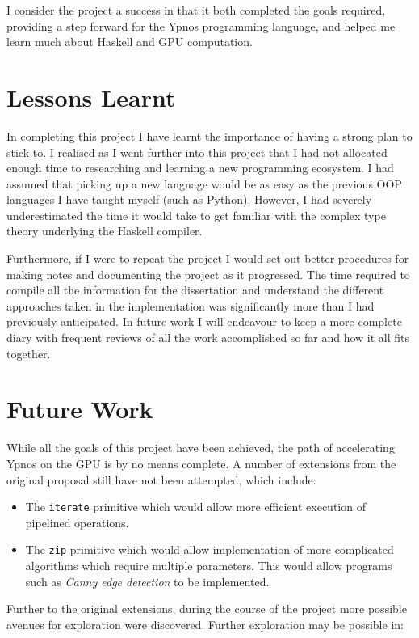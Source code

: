 \documentclass[12pt,a4paper,twoside]{scrbook}
\begin{document}
I consider the project a success in that it both completed the goals required,
providing a step forward for the Ypnos programming language, and helped me learn
much about Haskell and GPU computation.

\section{Lessons Learnt}

In completing this project I have learnt the importance of having a strong plan
to stick to. I realised as I went further into this project that I had not
allocated enough time to researching and learning a new programming ecosystem. I
had assumed that picking up a new language would be as easy as the previous OOP
languages I have taught myself (such as Python). However, I had severely
underestimated the time it would take to get familiar with the complex type
theory underlying the Haskell compiler.

Furthermore, if I were to repeat the project I would set out better procedures
for making notes and documenting the project as it progressed. The time required
to compile all the information for the dissertation and understand the different
approaches taken in the implementation was significantly more than I had
previously anticipated. In future work I will endeavour to keep a more complete
diary with frequent reviews of all the work accomplished so far and how it all
fits together.

\section{Future Work}

While all the goals of this project have been achieved, the path of accelerating
Ypnos on the GPU is by no means complete. A number of extensions from the
original proposal still have not been attempted, which include:

\begin{itemize}
\item The \texttt{iterate} primitive which would allow more efficient execution
  of pipelined operations.
\item The \texttt{zip} primitive which would allow implementation of more
  complicated algorithms which require multiple parameters. This would allow
  programs such as \emph{Canny edge detection} to be implemented.
\end{itemize}

Further to the original extensions, during the course of the project more
possible avenues for exploration were discovered. Further exploration may be
possible in:
\end{document}
